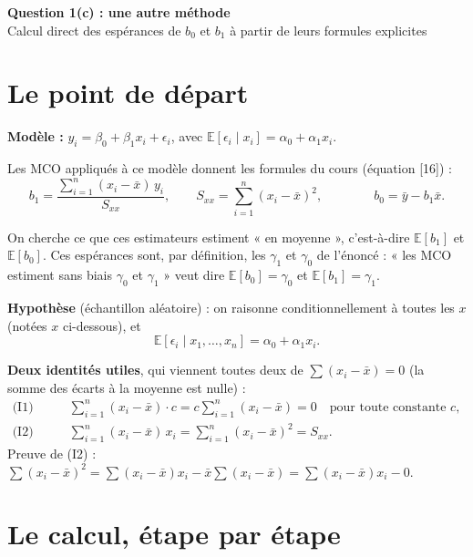 \documentclass[11pt,a4paper]{article}
\newcommand{\E}{\mathbb{E}}
\newcommand{\sumi}{\sum_{i=1}^{n}}
\newcommand{\Sxx}{S_{xx}}
\begin{document}
\begin{center}
{\LARGE\bfseries Question 1(c) : une autre méthode}\\[6pt]
{\large Calcul direct des espérances de $b_0$ et $b_1$ à partir de leurs formules explicites}
\end{center}

\tableofcontents

\section{Le point de départ}

\textbf{Modèle :} \quad $y_i=\beta_0+\beta_1x_i+\epsilon_i$, \quad avec \quad $\E[\epsilon_i\mid x_i]=\alpha_0+\alpha_1x_i$.

Les MCO appliqués à ce modèle donnent les formules du cours (équation [16]) :
\[
b_1=\frac{\sumi(x_i-\bar x)\,y_i}{\Sxx},\qquad \Sxx=\sumi(x_i-\bar x)^2,\qquad\qquad b_0=\bar y-b_1\bar x .
\]

\begin{cle}
On cherche ce que ces estimateurs estiment « en moyenne », c'est-à-dire $\E[b_1]$ et $\E[b_0]$. Ces espérances sont, par définition, les $\gamma_1$ et $\gamma_0$ de l'énoncé : « les MCO estiment sans biais $\gamma_0$ et $\gamma_1$ » veut dire $\E[b_0]=\gamma_0$ et $\E[b_1]=\gamma_1$.
\end{cle}

\textbf{Hypothèse} (échantillon aléatoire) : on raisonne conditionnellement à toutes les $x$ (notées $x$ ci-dessous), et
\[
\E[\epsilon_i\mid x_1,\dots,x_n]=\alpha_0+\alpha_1x_i .
\]

\textbf{Deux identités utiles}, qui viennent toutes deux de $\sum(x_i-\bar x)=0$ (la somme des écarts à la moyenne est nulle) :
\begin{align*}
\text{(I1)}\qquad & \sumi(x_i-\bar x)\cdot c=c\sumi(x_i-\bar x)=0 \quad\text{pour toute constante } c,\\
\text{(I2)}\qquad & \sumi(x_i-\bar x)\,x_i=\sumi(x_i-\bar x)^2=\Sxx .
\end{align*}
Preuve de (I2) : $\sum(x_i-\bar x)^2=\sum(x_i-\bar x)x_i-\bar x\sum(x_i-\bar x)=\sum(x_i-\bar x)x_i-0$.

\section{Le calcul, étape par étape}
\end{document}
